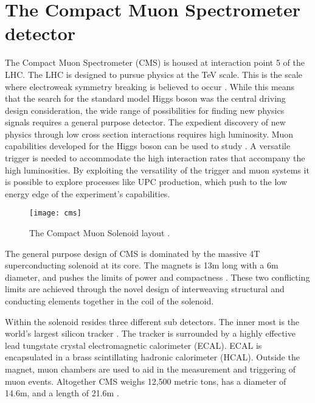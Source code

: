 \chapter{\label{ch:detector} The Compact Muon Spectrometer detector}	
  The Compact Muon Spectrometer (CMS) is housed at interaction point 5 of the 
    LHC. 
  The LHC is designed to pursue physics at the TeV scale. 
  This is the scale where electroweak symmetry breaking is believed to occur
  	\cite{CmsPTdrv2}.
  While this means that the search for the standard model Higgs boson was the 
    central driving design consideration, the wide range of possibilities for
  	finding new physics signals requires a general purpose detector.
  The expedient discovery of new physics through low cross section interactions 
  	requires high luminosity.
  Muon capabilities developed for the Higgs boson can be used to study \JPsi{}. 
  A versatile trigger is needed to accommodate the high interaction rates that 
    accompany the high luminosities. 
  By exploiting the versatility of the trigger and muon systems it
    is possible to explore processes like UPC \JPsi{} production, 
    which push to the low energy edge of the experiment's capabilities. 
  \begin{figure}[h]
    \centering
      \texttt{[image: cms]}
    \caption{The Compact Muon Solenoid layout \cite{tCmsE}.}
    \label{cms}
  \end{figure}
  
  The general purpose design of CMS is dominated by the massive 4T 
  	superconducting solenoid at its core.
  The magnets is 13m long with a 6m diameter, and pushes the limits of power
  	and compactness \cite{tCmsE}. 
  These two conflicting limits are achieved through the novel design of 
  	interweaving structural and conducting elements together in the coil of
  	the solenoid.

  Within the solenoid resides three different sub detectors.
  The inner most is the world's largest silicon tracker \cite{tCmsE}.
  The tracker is surrounded by a highly effective lead tungstate crystal 
    electromagnetic calorimeter (ECAL).
  ECAL is encapsulated in a brass scintillating hadronic calorimeter (HCAL).
  Outside the magnet, muon chambers are used to aid in the measurement and 
    triggering of muon events. 
  Altogether CMS weighs 12,500 metric tons, has a diameter of 14.6m,
    and a length of 21.6m \cite{tCmsE}.

